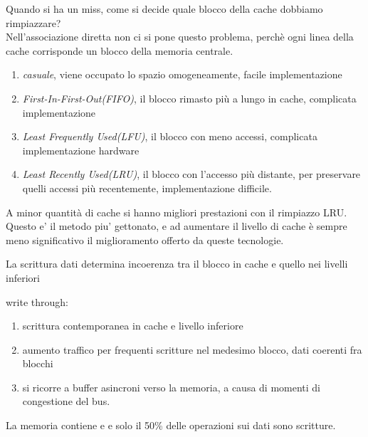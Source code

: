 \documentclass[12pt, a4paper]{article}
\begin{document}
\begin{defn}
Quando si ha un miss, come si decide quale blocco della cache dobbiamo rimpiazzare?\\
Nell'associazione diretta non ci si pone questo problema, perchè ogni linea della 
cache corrisponde un blocco della memoria centrale.\\

\begin{enumerate}
	\item \textit{casuale}, viene occupato lo spazio omogeneamente, facile implementazione
	\item \textit{First-In-First-Out(FIFO)}, il blocco rimasto più a lungo in cache,
		complicata implementazione
	\item \textit{Least Frequently Used(LFU)}, il blocco con meno accessi, 
		complicata implementazione hardware
	\item \textit{Least Recently Used(LRU)}, il blocco con l'accesso più distante,
		per preservare quelli accessi più recentemente, implementazione difficile.
\end{enumerate}
A minor quantità di cache si hanno migliori prestazioni con il rimpiazzo LRU.\\
Questo e' il metodo piu' gettonato, e ad aumentare il livello di cache 
è sempre meno significativo il miglioramento offerto da queste tecnologie.

\end{defn}
La scrittura dati determina incoerenza tra il blocco in cache e quello nei livelli inferiori


\begin{defn}
write through:

\begin{enumerate}
	\item scrittura contemporanea in cache e livello inferiore
	\item aumento traffico per frequenti scritture nel medesimo blocco,
		dati coerenti fra blocchi
	\item si ricorre a buffer asincroni verso la memoria, a
		causa di momenti di congestione del bus.
\end{enumerate}
\end{defn}
La memoria contiene  e  e solo il 50\% delle operazioni
sui dati sono scritture.
\end{document}
